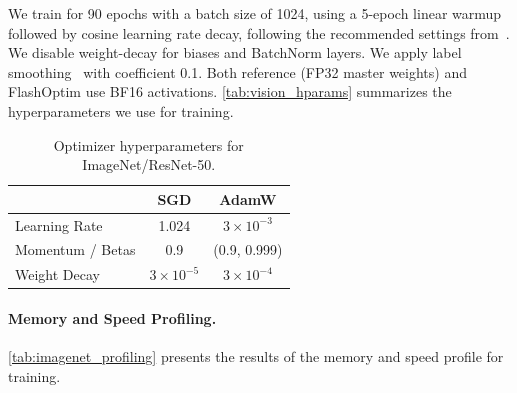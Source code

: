 \documentclass[10pt,twocolumn,letterpaper]{article}
\theoremstyle{plain}
\theoremstyle{definition}
\theoremstyle{remark}
\newcommand{\flashOptim}{FlashOptim\xspace}
\begin{document}
We train for 90 epochs with a batch size of 1024, using a 5-epoch linear warmup followed by cosine learning rate decay, following the recommended settings from~\citep{goyal2017accurate}. We disable weight-decay for biases and BatchNorm layers. We apply label smoothing~\citep{szegedy2016rethinking} with coefficient 0.1. Both reference (FP32 master weights) and \flashOptim use BF16 activations. \autoref{tab:vision_hparams} summarizes the hyperparameters we use for training.

\begin{table}[ht]
\centering
\caption{Optimizer hyperparameters for ImageNet/ResNet-50.}
\label{tab:vision_hparams}
\small
\begin{tabular}{@{}lcc@{}}
\toprule
& SGD & AdamW \\
\midrule
Learning Rate & 1.024 & $3 \times 10^{-3}$ \\
Momentum / Betas & 0.9 & (0.9, 0.999) \\
Weight Decay & $3 \times 10^{-5}$ & $3 \times 10^{-4}$ \\
\bottomrule
\end{tabular}
\end{table}

\paragraph{Memory and Speed Profiling.}
\autoref{tab:imagenet_profiling} presents the results of the memory and speed profile for training.
\end{document}
